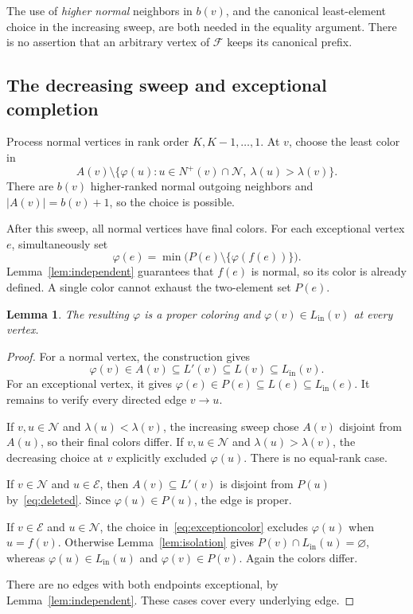 \documentclass[11pt,a4paper]{article}
\numberwithin{equation}{section}
\newtheorem{lemma}[theorem]{Lemma}
\newcommand{\Nout}{N^{+}}
\newcommand{\Lin}{L_{\mathrm{in}}}
\newcommand{\full}{\mathcal F}
\newcommand{\exc}{\mathcal E}
\newcommand{\normal}{\mathcal N}
\begin{document}
The use of \emph{higher normal} neighbors in \(b(v)\), and the
canonical least-element choice in the increasing sweep, are both
needed in the equality argument. There is no assertion that an
arbitrary vertex of \(\full\) keeps its canonical prefix.

\subsection{The decreasing sweep and exceptional completion}

Process normal vertices in rank order \(K,K-1,\ldots,1\).
At \(v\), choose the least color in
\begin{equation}
 A(v)\setminus
 \{\varphi(u):u\in\Nout(v)\cap\normal,\
                    \lambda(u)>\lambda(v)\}.
 \label{eq:normalcolor}
\end{equation}
There are \(b(v)\) higher-ranked normal outgoing neighbors and
\(|A(v)|=b(v)+1\), so the choice is possible.

After this sweep, all normal vertices have final colors.
For each exceptional vertex \(e\), simultaneously set
\begin{equation}
 \varphi(e)=\min\bigl(P(e)\setminus\{\varphi(f(e))\}\bigr).
 \label{eq:exceptioncolor}
\end{equation}
Lemma~\ref{lem:independent} guarantees that \(f(e)\) is normal,
so its color is already defined. A single color cannot exhaust the
two-element set \(P(e)\).

\begin{lemma}
\label{lem:correctness}
The resulting \(\varphi\) is a proper coloring and
\(\varphi(v)\in\Lin(v)\) at every vertex.
\end{lemma}
\begin{proof}
For a normal vertex, the construction gives
\[
 \varphi(v)\in A(v)\subseteq L'(v)\subseteq L(v)\subseteq\Lin(v).
\]
For an exceptional vertex, it gives
\(\varphi(e)\in P(e)\subseteq L(e)\subseteq\Lin(e)\).
It remains to verify every directed edge \(v\to u\).

If \(v,u\in\normal\) and \(\lambda(u)<\lambda(v)\), the increasing
sweep chose \(A(v)\) disjoint from \(A(u)\), so their final colors
differ. If \(v,u\in\normal\) and \(\lambda(u)>\lambda(v)\),
the decreasing choice at \(v\) explicitly excluded \(\varphi(u)\).
There is no equal-rank case.

If \(v\in\normal\) and \(u\in\exc\), then
\(A(v)\subseteq L'(v)\) is disjoint from \(P(u)\) by~\eqref{eq:deleted}.
Since \(\varphi(u)\in P(u)\), the edge is proper.

If \(v\in\exc\) and \(u\in\normal\), the choice
in~\eqref{eq:exceptioncolor} excludes \(\varphi(u)\) when \(u=f(v)\).
Otherwise Lemma~\ref{lem:isolation} gives
\(P(v)\cap\Lin(u)=\varnothing\), whereas
\(\varphi(u)\in\Lin(u)\) and \(\varphi(v)\in P(v)\).
Again the colors differ.

There are no edges with both endpoints exceptional, by
Lemma~\ref{lem:independent}. These cases cover every underlying edge.
\end{proof}
\end{document}

